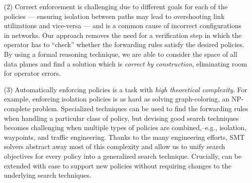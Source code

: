 

(2) Correct enforcement is challenging due to different goals for each
of the policies --- ensuring isolation between paths may
lead to overshooting link utilizations and vice-versa --- and is a
common cause of incorrect configurations in networks.  Our approach
removes the need for a verification step in which the operator has to
``check'' whether the forwarding rules satisfy the desired
policies.  By using a formal reasoning technique, we are
able to consider the space of all data planes and find a solution
which is \emph{correct by construction}, eliminating room for operator
errors.


(3) Automatically enforcing policies is a task with
\emph{high theoretical complexity}.  For example, enforcing isolation
policies is as hard as solving graph-coloring, an 
NP-complete problem. Specialized techniques can be used to find the
forwarding rules when handling a particular class of policy, but 
 devising good search techniques becomes
 challenging when 
multiple types of policies are combined,--e.g., isolation, waypoints,
and traffic engineering.  Thanks to the many engineering efforts, SMT solvers
abstract away most of this complexity and allow us to unify search
objectives for every policy into a generalized search technique.
Crucially, \Name can be extended with ease to support new policies  without requiring changes to the underlying search
techniques.

